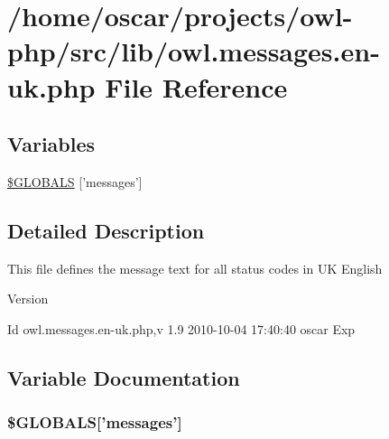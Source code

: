 \section{/home/oscar/projects/owl-\/php/src/lib/owl.messages.en-\/uk.php File Reference}
\label{owl_8messages_8en-uk_8php}
\subsection*{Variables}
\begin{DoxyCompactItemize}
\item 
\hyperlink{owl_8messages_8en-uk_8php_a65f2996116eed36e9ab25f254a470259}{\$GLOBALS} \mbox{[}'messages'\mbox{]}
\end{DoxyCompactItemize}


\subsection{Detailed Description}
This file defines the message text for all status codes in UK English \begin{DoxyVersion}{Version}

\end{DoxyVersion}
\begin{DoxyParagraph}{Id}
owl.messages.en-\/uk.php,v 1.9 2010-\/10-\/04 17:40:40 oscar Exp 
\end{DoxyParagraph}


\subsection{Variable Documentation}
\subsubsection[{\$GLOBALS}]{\setlength{\rightskip}{0pt plus 5cm}\$GLOBALS\mbox{[}'messages'\mbox{]}}\label{owl_8messages_8en-uk_8php_a65f2996116eed36e9ab25f254a470259}
